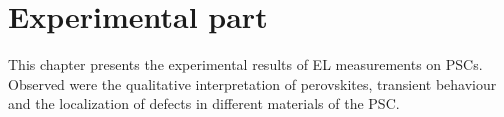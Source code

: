
\chapter{Experimental part}
This chapter presents the experimental results of EL measurements on PSCs. Observed were the qualitative interpretation of perovskites, transient behaviour and the localization of defects in different materials of the PSC.